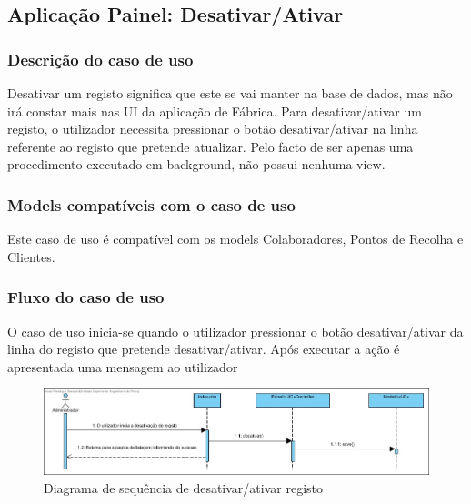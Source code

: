 \subsection{Aplicação Painel: Desativar/Ativar}
\subsubsection*{Descrição do caso de uso}
Desativar um registo significa que este se vai manter na base de dados, mas não irá constar mais nas UI da aplicação de Fábrica. Para desativar/ativar um registo, o utilizador necessita pressionar o botão desativar/ativar na linha referente ao registo que pretende atualizar. Pelo facto de ser apenas uma procedimento executado em background, não possui nenhuma view.

\subsubsection*{Models compatíveis com o caso de uso}
Este caso de uso é compatível com os models Colaboradores, Pontos de Recolha e Clientes.

\subsubsection*{Fluxo do caso de uso}
O caso de uso inicia-se quando o utilizador pressionar o botão desativar/ativar da linha do registo que pretende desativar/ativar. Após executar a ação é apresentada uma mensagem ao utilizador


\begin{figure}[H] 
	\begin{center}
		\includegraphics[width=\textwidth,keepaspectratio]{figuras/Diagramas_vp/SD_Painel_5_Desativar.jpg}
		\caption{Diagrama de sequência de desativar/ativar registo}
		\label{fig:sd_desativar} 
	\end{center}
\end{figure}